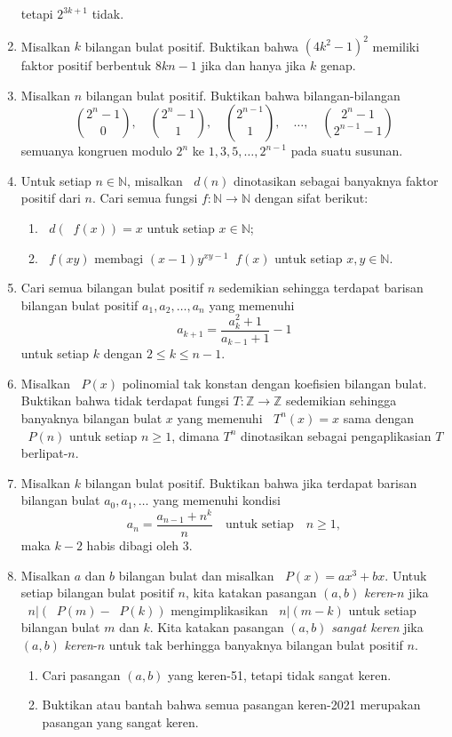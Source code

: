 \documentclass[12pt]{article}
\newcommand*\func[2]{\mathop{}\!{#1}{\left({#2}\right)}}
\newcommand*\divid[2]{\mathop{}\!{#1} \left| {#2} \right.}
\begin{document}
\begin{enumerate}[leftmargin=*]
		tetapi $ 2^{3k + 1} $ tidak.
		\item Misalkan $ k $ bilangan bulat positif. Buktikan bahwa $ \left(4k^{2} - 1\right)^{2} $ memiliki faktor positif berbentuk $ 8kn - 1 $ jika dan hanya jika $ k $ genap.
		\item Misalkan $ n $ bilangan bulat positif. Buktikan bahwa bilangan-bilangan
		\[ \binom{2^{n} - 1}{0}, \quad \binom{2^{n} - 1}{1}, \quad \binom{2^{n - 1}}{1}, \quad \dots, \quad \binom{2^{n} - 1}{2^{n - 1} - 1} \]
		semuanya kongruen modulo $ 2^{n} $ ke $ 1, 3, 5, \dots, 2^{n - 1} $ pada suatu susunan.
		\item Untuk setiap $ n \in \mathbb{N} $, misalkan $ \func{d}{n} $ dinotasikan sebagai banyaknya faktor positif dari $ n $. Cari semua fungsi $ f : \mathbb{N} \to \mathbb{N} $ dengan sifat berikut:
		\begin{enumerate}
			\item $ \func{d}{\func{f}{x}} = x $ untuk setiap $ x \in \mathbb{N} $;
			\item $ \func{f}{xy} $ membagi $ \left(x - 1\right)y^{xy - 1}\func{f}{x} $ untuk setiap $ x, y \in \mathbb{N} $.
		\end{enumerate}
		\item Cari semua bilangan bulat positif $ n $ sedemikian sehingga terdapat barisan bilangan bulat positif $ a_{1}, a_{2}, \dots, a_{n} $ yang memenuhi
		\[ a_{k + 1} = \frac{a_{k}^{2} + 1}{a_{k - 1} + 1} - 1 \]
		untuk setiap $ k $ dengan $ 2 \leq k \leq n - 1 $.
		\item Misalkan $ \func{P}{x} $ polinomial tak konstan dengan koefisien bilangan bulat. Buktikan bahwa tidak terdapat fungsi $ T : \mathbb{Z} \to \mathbb{Z} $ sedemikian sehingga banyaknya bilangan bulat $ x $ yang memenuhi $ \func{T^{n}}{x} = x $ sama dengan $ \func{P}{n} $ untuk setiap $ n \geq 1 $, dimana $ T^{n} $ dinotasikan sebagai pengaplikasian $ T $ berlipat-$ n $.
		\item Misalkan $ k $ bilangan bulat positif. Buktikan bahwa jika terdapat barisan bilangan bulat $ a_{0}, a_{1}, \dots $ yang memenuhi kondisi
		\[ a_{n} = \frac{a_{n - 1} + n^{k}}{n} \quad \mbox{untuk setiap} \quad n \geq 1, \]
		maka $ k - 2 $ habis dibagi oleh 3.
		\item Misalkan $ a $ dan $ b $ bilangan bulat dan misalkan $ \func{P}{x} = ax^{3} + bx $. Untuk setiap bilangan bulat positif $ n $, kita katakan pasangan $ \left(a, b\right) $ \textit{keren}-$ n $ jika $ \divid{n}{\left(\func{P}{m} - \func{P}{k}\right)} $ mengimplikasikan $ \divid{n}{\left(m - k\right)} $ untuk setiap bilangan bulat $ m $ dan $ k $. Kita katakan pasangan $ \left(a, b\right) $ \textit{sangat keren} jika $ \left(a, b\right) $ \textit{keren}-$ n $ untuk tak berhingga banyaknya bilangan bulat positif $ n $.
		\begin{enumerate}
			\item Cari pasangan $ \left(a, b\right) $ yang keren-51, tetapi tidak sangat keren.
			\item Buktikan atau bantah bahwa semua pasangan keren-2021 merupakan pasangan yang sangat keren.
		\end{enumerate}
		

\end{enumerate}
\end{document}
